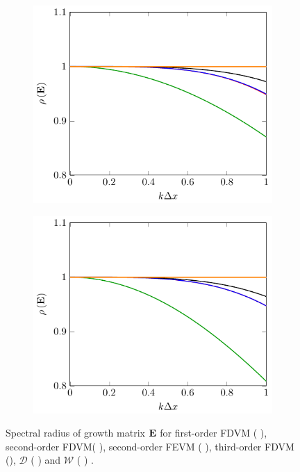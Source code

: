 \begin{figure}
	\centering
	\begin{subfigure}{0.5\textwidth}
		\includegraphics[width=\textwidth]{./chp5/figures/stabilityu=0kh0p5.pdf}
	\end{subfigure}%
	\begin{subfigure}{0.5\textwidth}
		\includegraphics[width=\textwidth]{./chp5/figures/stabilityu=0kh2p5.pdf}
	\end{subfigure}
	\caption{Spectral radius of growth matrix $\mathbf{E}$ for first-order FDVM ({\color{green!60!black} \solidrule}), second-order FDVM({\color{red} \solidrule}), second-order FEVM ({\color{blue} \solidrule}), third-order FDVM ({\solidrule}), $\mathcal{D}$ ({\color{violet!80!white} \solidrule}) and $\mathcal{W}$ ({\color{orange} \solidrule}) .}
	\label{fig:Stabu=0}
\end{figure}

